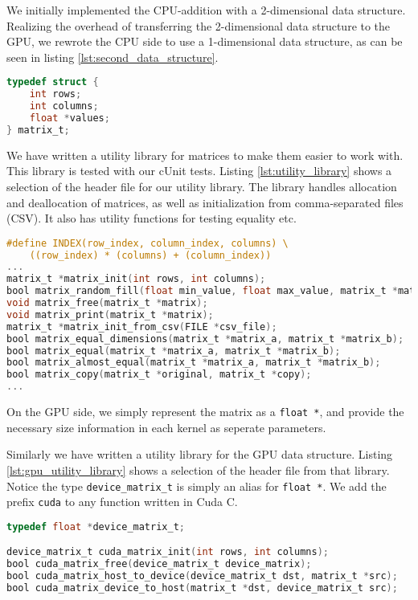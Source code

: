 \noindent We initially implemented the CPU-addition with a 2-dimensional data structure. Realizing the overhead of transferring the 2-dimensional data structure to the GPU, we rewrote the CPU side to use a 1-dimensional data structure, as can be seen in listing \ref{lst:second_data_structure}.

\begin{lstlisting}[language=C, caption={Second implementation of the matrix data structure.}, label={lst:second_data_structure}]
typedef struct {
    int rows;
    int columns;
    float *values;
} matrix_t;
\end{lstlisting}

\noindent We have written a utility library for matrices to make them easier to work with. This library is tested with our cUnit tests. Listing \ref{lst:utility_library} shows a selection of the header file for our utility library. The library handles allocation and deallocation of matrices, as well as initialization from comma-separated files (CSV). It also has utility functions for testing equality etc.

\begin{lstlisting}[language=C, caption={Utility library for the CPU data structure.}, label={lst:utility_library}]
#define INDEX(row_index, column_index, columns) \
    ((row_index) * (columns) + (column_index))
...
matrix_t *matrix_init(int rows, int columns);
bool matrix_random_fill(float min_value, float max_value, matrix_t *matrix);
void matrix_free(matrix_t *matrix);
void matrix_print(matrix_t *matrix);
matrix_t *matrix_init_from_csv(FILE *csv_file);
bool matrix_equal_dimensions(matrix_t *matrix_a, matrix_t *matrix_b);
bool matrix_equal(matrix_t *matrix_a, matrix_t *matrix_b);
bool matrix_almost_equal(matrix_t *matrix_a, matrix_t *matrix_b);
bool matrix_copy(matrix_t *original, matrix_t *copy);
...
\end{lstlisting}

\noindent On the GPU side, we simply represent the matrix as a \texttt{float *}, and provide the necessary size information in each kernel as seperate parameters.

Similarly we have written a utility library for the GPU data structure. Listing \ref{lst:gpu_utility_library} shows a selection of the header file from that library. Notice the type \texttt{device\_matrix\_t} is simply an alias for \texttt{float *}. We add the prefix \texttt{cuda} to any function written in Cuda C. 

\begin{lstlisting}[language=C, caption={Utility library for the GPU data structure.}, label={lst:gpu_utility_library}]
typedef float *device_matrix_t;

device_matrix_t cuda_matrix_init(int rows, int columns);
bool cuda_matrix_free(device_matrix_t device_matrix);
bool cuda_matrix_host_to_device(device_matrix_t dst, matrix_t *src);
bool cuda_matrix_device_to_host(matrix_t *dst, device_matrix_t src);
\end{lstlisting}